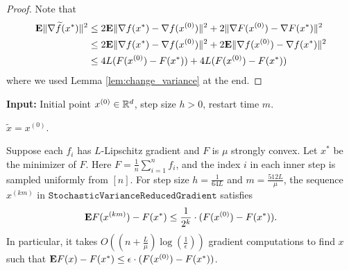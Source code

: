 \begin{proof}
Note that
\begin{align*}
\mathbf{E}\|\nabla\widetilde{f}(x^{*})\|^{2} & \leq2\mathbf{E}\|\nabla f(x^{*})-\nabla f(x^{(0)})\|^{2}+2\|\nabla F(x^{(0)})-\nabla F(x^{*})\|^{2}\\
 & \leq2\mathbf{E}\|\nabla f(x^{*})-\nabla f(x^{(0)})\|^{2}+2\mathbf{E}\|\nabla f(x^{(0)})-\nabla f(x^{*})\|^{2}\\
 & \leq4L(F(x^{(0)})-F(x^{*}))+4L(F(x^{(0)})-F(x^{*}))
\end{align*}
where we used Lemma \ref{lem:change_variance} at the end.
\end{proof}
\begin{algorithm2e}[H]

\caption{$\mathtt{StochasticVarianceReducedGradient}$ (SVRG)}

\SetAlgoLined

\textbf{Input:} Initial point $x^{(0)}\in\mathbb{R}^{d}$, step size $h>0$,
restart time $m$.

$\widetilde{x}=x^{(0)}$.


\end{algorithm2e}
\begin{thm}
\label{thm:stochastic_method}Suppose each $f_{i}$ has $L$-Lipschitz
gradient and $F$ is $\mu$ strongly convex. Let $x^{*}$ be the minimizer
of $F$. Here $F=\frac{1}{n}\sum^{n}_{i=1}f_{i}$, and the index $i$
in each inner step is sampled uniformly from $[n]$. For step size
$h=\frac{1}{64L}$ and $m=\frac{512L}{\mu}$, the sequence $x^{(km)}$
in $\mathtt{StochasticVarianceReducedGradient}$ satisfies
\[
\mathbf{E} F(x^{(km)})-F(x^{*})\leq\frac{1}{2^{k}}\cdot(F(x^{(0)})-F(x^{*})).
\]
In particular, it takes $O((n+\frac{L}{\mu})\log(\frac{1}{\epsilon}))$
gradient computations to find $x$ such that $\mathbf{E} F(x)-F(x^{*})\leq\epsilon\cdot(F(x^{(0)})-F(x^{*}))$.
\end{thm}

